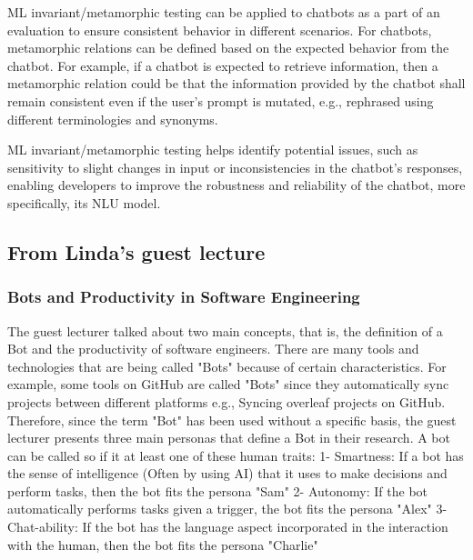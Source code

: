 \documentclass[10pt, a4paper]{article}
\begin{document}
ML invariant/metamorphic testing can be applied to chatbots as a part of an evaluation to ensure consistent behavior in different scenarios. For chatbots, metamorphic relations can be defined based on the expected behavior from the chatbot. For example, if a chatbot is expected to retrieve information, then a metamorphic relation could be that the information provided by the chatbot shall remain consistent even if the user's prompt is mutated, e.g., rephrased using different terminologies and synonyms. %

ML invariant/metamorphic testing helps identify potential issues, such as sensitivity to slight changes in input or inconsistencies in the chatbot's responses, enabling developers to improve the robustness and reliability of the chatbot, more specifically, its NLU model.


\subsection{From Linda's guest lecture}

\subsubsection{Bots and Productivity in Software Engineering}
The guest lecturer talked about two main concepts, that is, the definition of a Bot and the productivity of software engineers. There are many tools and technologies that are being called "Bots" because of certain characteristics. For example, some tools on GitHub are called "Bots" since they automatically sync projects between different platforms e.g., Syncing overleaf projects on GitHub. Therefore, since the term "Bot" has been used without a specific basis, the guest lecturer presents three main personas that define a Bot in their research. A bot can be called so if it at least one of these human traits:
1- Smartness: If a bot has the sense of intelligence (Often by using AI) that it uses to make decisions and perform tasks, then the bot fits the persona "Sam"
2- Autonomy: If the bot automatically performs tasks given a trigger, the bot fits the persona "Alex"
3- Chat-ability: If the bot has the language aspect incorporated in the interaction with the human, then the bot fits the persona "Charlie"
\end{document}
